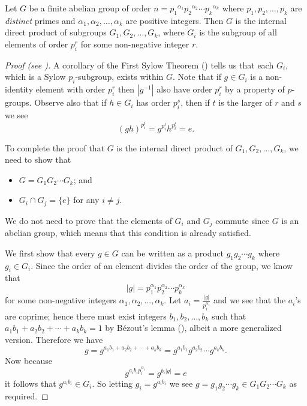 \begin{lemma}\label{lemma-fundamental-theorem-of-finite-abelian-groups-1}
    Let $G$ be a finite abelian group of order $n = {p_1}^{\alpha_1}{p_2}^{\alpha_2}\cdots{p_k}^{\alpha_k}$ where $p_1, p_2, \dots, p_k$ are \textit{distinct} primes and $\alpha_1, \alpha_2, \dots, \alpha_k$ are positive integers. Then $G$ is the internal direct product of subgroups $G_1, G_2, \dots, G_k$, where $G_i$ is the subgroup of all elements of order $p_i^r$ for some non-negative integer $r$.
\end{lemma}
\begin{proof}[Proof (see {\cite[Lemma 13.8]{judson_beezer_2022}})]
    A corollary of the First Sylow Theorem () tells us that each $G_i$, which is a Sylow $p_i$-subgroup, exists within $G$. Note that if $g \in G_i$ is a non-identity element with order $p_i^r$ then $|g^{-1}|$ also have order $p_i^r$ by a property of $p$-groups. Observe also that if $h \in G_i$ has order $p_i^s$, then if $t$ is the larger of $r$ and $s$ we see
    \[
        (gh)^{p_i^t} = g^{p_i^t}h^{p_i^t} = e.
    \]

    To complete the proof that $G$ is the internal direct product of $G_1, G_2, \dots, G_k$, we need to show that
    \begin{itemize}
        \item $G = G_1G_2\cdots G_k$; and
        \item $G_i \cap G_j = \{e\}$ for any $i \neq j$.
    \end{itemize}
    We do not need to prove that the elements of $G_i$ and $G_j$ commute since $G$ is an abelian group, which means that this condition is already satisfied.

    We first show that every $g \in G$ can be written as a product $g_1g_2\cdots g_k$ where $g_i \in G_i$. Since the order of an element divides the order of the group, we know that
    \[
        |g| = p_1^{\alpha_1}p_2^{\alpha_2}\cdots p_k^{\alpha_k}
    \]
    for some non-negative integers $\alpha_1, \alpha_2, \dots, \alpha_k$. Let $a_i = \frac{|g|}{p_i^{\alpha_i}}$ and we see that the $a_i$'s are coprime; hence there must exist integers $b_1, b_2, \dots, b_k$ such that $a_1b_1 + a_2b_2 + \cdots + a_kb_k = 1$ by B\'ezout's lemma (), albeit a more generalized version. Therefore we have
    \[
        g = g^{a_1b_1 + a_2b_2 + \cdots + a_kb_k} = g^{a_1b_1}g^{a_2b_2}\cdots g^{a_kb_k}.
    \]
    Now because
    \[
        g^{a_ib_ip_i^{\alpha_i}} = g^{b_i|g|} = e
    \]
    it follows that $g^{a_ib_i} \in G_i$. So letting $g_i = g^{a_ib_i}$ we see $g = g_1g_2\cdots g_k \in G_1G_2\cdots G_k$ as required.


\end{proof}
